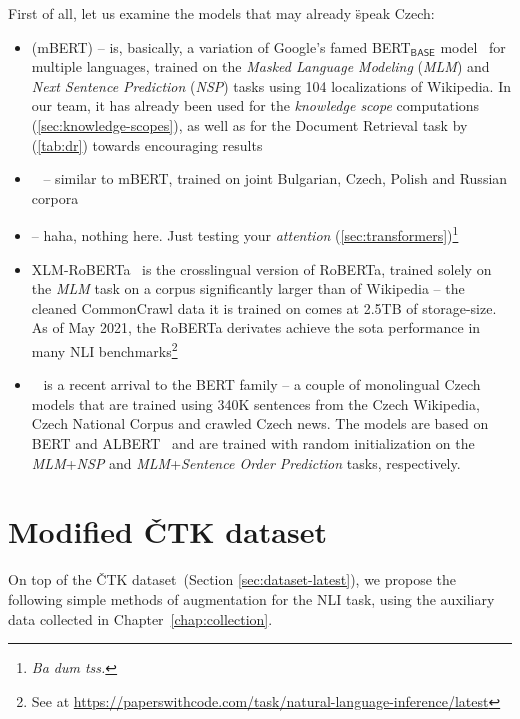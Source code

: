 First of all, let us examine the models that may already \"{speak} Czech: 
\begin{itemize} 
    \item {} ({\techbf mBERT}) -- is, basically, a variation of \textsf{Google}'s famed \textsf{BERT}$_\textsf{BASE}$ model~\cite{bert} for multiple languages, trained on the \textit{Masked Language Modeling} (\textit{MLM}) and \textit{Next Sentence Prediction} (\textit{NSP}) tasks using 104 localizations of \textsf{Wikipedia}. In our team, it has already been used for the \textit{knowledge scope} computations (\ref{sec:knowledge-scopes}), as well as for the Document Retrieval task by~\cite{rypar,michal} (\ref{tab:dr}) towards encouraging results
    
    \item {}~\cite{slavicbert} -- similar to \textsf{mBERT}, trained on joint Bulgarian, Czech, Polish and Russian corpora
   
   \item {} -- haha, nothing here. Just testing your \textit{attention} (\ref{sec:transformers})\footnote{\textit{Ba dum tss.}}
   \item {\techbf XLM-RoBERTa}~\cite{xlm-roberta} is the crosslingual version of \textsf{RoBERTa}, trained solely on the \textit{MLM} task on a corpus significantly larger than of \textsf{Wikipedia} -- the cleaned \textsf{CommonCrawl} data it is trained on comes at 2.5TB of storage-size. As of May 2021, the \textsf{RoBERTa} derivates achieve the sota performance in many NLI benchmarks\footnote{See at \url{https://paperswithcode.com/task/natural-language-inference/latest}}
    \item {}~\cite{czert} is a recent arrival to the \textsf{BERT} family -- a couple of monolingual Czech models that are trained using 340K sentences from the Czech \textsf{Wikipedia}, \textsf{Czech National Corpus} and crawled Czech news. The models are based on \textsf{BERT} and \textsf{ALBERT}~\cite{albert} and are trained with random initialization on the \textit{MLM}+\textit{NSP} and \textit{MLM}+\textit{Sentence Order Prediction} tasks, respectively.
\end{itemize}
\section{Modified ČTK dataset}
\label{sec:modified-ctk}
On top of the \textsf{ČTK} dataset~(Section \ref{sec:dataset-latest}), we propose the following simple methods of augmentation for the NLI task, using the auxiliary data collected in Chapter~\ref{chap:collection}.

